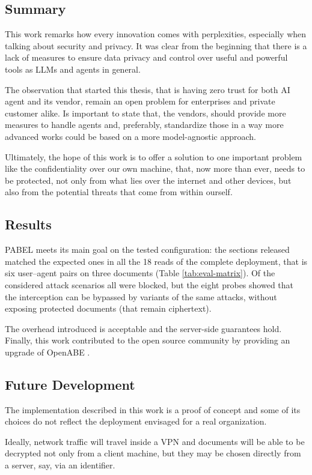 \subsection{Summary}
This work remarks how every innovation comes with perplexities, especially when talking about security and privacy.
It was clear from the beginning that there is a lack of measures to ensure data privacy and control over useful and powerful tools as LLMs and agents in general.

The observation that started this thesis, that is having zero trust for both AI agent and its vendor, remain an open problem for enterprises and private customer alike.
Is important to state that, the vendors, should provide more measures to handle agents and, preferably, standardize those in a way more advanced works could be based on a more model-agnostic approach.

Ultimately, the hope of this work is to offer a solution to one important problem like the confidentiality over our own machine, that, now more than ever, needs to be protected, not only from what lies over the internet and other devices, but also from the potential threats that come from within ourself.
\subsection{Results}
PABEL meets its main goal on the tested configuration:
the sections released matched the expected ones in all the 18 reads of the complete deployment, that is six user--agent pairs on three documents (Table \ref{tab:eval-matrix}).
Of the considered attack scenarios all were blocked, but the eight probes showed that the interception can be bypassed by variants of the same attacks, without exposing protected documents (that remain ciphertext).

The overhead introduced is acceptable and the server-side guarantees hold.
Finally, this work contributed to the open source community by providing an upgrade of OpenABE \cite{openabefork}.

\subsection{Future Development}\label{Future Development}
The implementation described in this work is a proof of concept and some of its choices do not reflect the deployment envisaged for a real organization.

Ideally, network traffic will travel inside a VPN and documents will be able to be decrypted not only from a client machine, but they may be chosen directly from a server, say, via an identifier.

